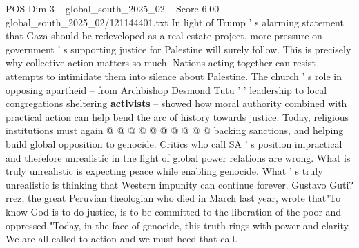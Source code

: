 \begin{textsample}{POS Dim 3 – global\_south\_2025\_02 – Score 6.00 – global\_south\_2025\_02/121144401.txt}
In light of Trump ' s alarming statement that Gaza should be redeveloped as a real estate project, more pressure on government ' s supporting justice for Palestine will surely follow.
This is precisely why collective action matters so much.
Nations acting together can resist attempts to intimidate them into silence about Palestine.
The church ' s role in opposing apartheid -- from Archbishop Desmond Tutu ' ' leadership to local congregations sheltering \textbf{activists} -- showed how moral authority combined with practical action can help bend the arc of history towards justice.
Today, religious institutions must again @ @ @ @ @ @ @ @ @ @ backing sanctions, and helping build global opposition to genocide.
Critics who call SA ' s position impractical and therefore unrealistic in the light of global power relations are wrong.
What is truly unrealistic is expecting peace while enabling genocide.
What ' s truly unrealistic is thinking that Western impunity can continue forever.
Gustavo Guti? rrez, the great Peruvian theologian who died in March last year, wrote that"To know God is to do justice, is to be committed to the liberation of the poor and oppressed."Today, in the face of genocide, this truth rings with power and clarity.
We are all called to action and we must heed that call.

\end{textsample}
